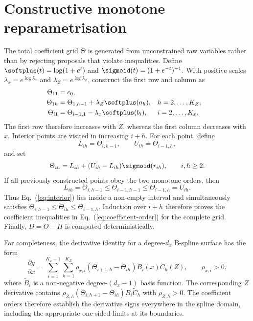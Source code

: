 \section{Constructive monotone reparametrisation}
\label{app:monotone}

The total coefficient grid $\Theta$ is generated from unconstrained raw
variables rather than by rejecting proposals that violate inequalities.  Define
$\softplus(t)=\log(1+e^t)$ and
$\sigmoid(t)=(1+e^{-t})^{-1}$.  With positive scales
$\lambda_x=e^{\log\lambda_x}$ and $\lambda_Z=e^{\log\lambda_Z}$, construct the
first row and column as
\begin{align}
 \Theta_{11}&=c_0,\\
 \Theta_{1h}&=\Theta_{1,h-1}+\lambda_Z\softplus(a_h),
 &&h=2,\ldots,K_Z,\\
 \Theta_{i1}&=\Theta_{i-1,1}-\lambda_x\softplus(b_i),
 &&i=2,\ldots,K_x.
 \label{eq:boundaries}
\end{align}
The first row therefore increases with $Z$, whereas the first column decreases
with $x$.  Interior points are visited in increasing $i+h$.  For each point,
define
\begin{equation}
 L_{ih}=\Theta_{i,h-1},\qquad U_{ih}=\Theta_{i-1,h},
\end{equation}
and set
\begin{equation}
 \Theta_{ih}=L_{ih}+(U_{ih}-L_{ih})\sigmoid(r_{ih}),
 \qquad i,h\ge2.
 \label{eq:interior}
\end{equation}
If all previously constructed points obey the two monotone orders, then
\begin{equation}
 L_{ih}=\Theta_{i,h-1}\le\Theta_{i-1,h-1}\le
 \Theta_{i-1,h}=U_{ih}.
\end{equation}
Thus Eq.~(\ref{eq:interior}) lies inside a non-empty interval and simultaneously
satisfies
$\Theta_{i,h-1}\le\Theta_{ih}\le\Theta_{i-1,h}$.  Induction over $i+h$
therefore proves the coefficient inequalities in Eq.~(\ref{eq:coefficient-order})
for the complete grid.  Finally, $D=\Theta-\Pi$ is computed deterministically.

For completeness, the derivative identity for a degree-$d_x$ B-spline surface
has the form
\begin{equation}
 \frac{\partial g}{\partial x}=
 \sum_{i=1}^{K_x-1}\sum_{h=1}^{K_Z}
 \rho_{x,i}(\Theta_{i+1,h}-\Theta_{ih})
 \widetilde B_i(x)C_h(Z),\qquad \rho_{x,i}>0,
\end{equation}
where $\widetilde B_i$ is a non-negative degree-$(d_x-1)$ basis function.
The corresponding $Z$ derivative contains
$\rho_{Z,h}(\Theta_{i,h+1}-\Theta_{ih})B_i\widetilde C_h$ with
$\rho_{Z,h}>0$.  The coefficient orders therefore establish the derivative
signs everywhere in the spline domain, including the appropriate one-sided
limits at its boundaries.
